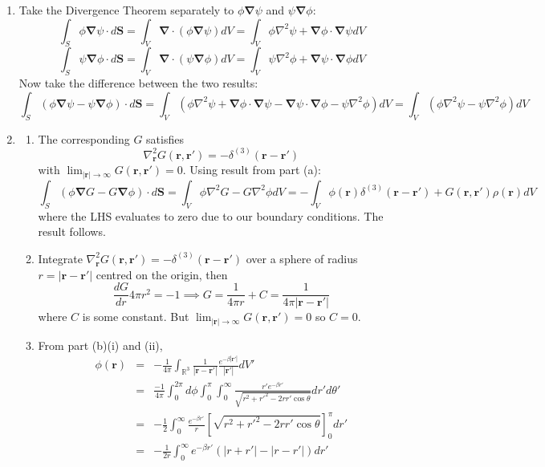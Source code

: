 \documentclass[a4paper]{article}
\begin{document}
\begin{ans}\leavevmode
\begin{enumerate}[label=(\alph*)]
\item Take the Divergence Theorem separately to $\phi\boldsymbol{\nabla}\psi$ and $\psi\boldsymbol{\nabla}\phi$:
$$\int_S\phi\boldsymbol{\nabla}\psi\cdot d\mathbf{S}=\int_V\boldsymbol{\nabla}\cdot(\phi\boldsymbol{\nabla}\psi)dV=\int_V\phi\nabla^2\psi+\boldsymbol{\nabla}\phi\cdot\boldsymbol{\nabla}\psi dV$$
$$\int_S\psi\boldsymbol{\nabla}\phi\cdot d\mathbf{S}=\int_V\boldsymbol{\nabla}\cdot(\psi\boldsymbol{\nabla}\phi)dV=\int_V\psi\nabla^2\phi+\boldsymbol{\nabla}\psi\cdot\boldsymbol{\nabla}\phi dV$$
Now take the difference between the two results:
$$\int_S(\phi\boldsymbol{\nabla}\psi-\psi\boldsymbol{\nabla}\phi)\cdot d\mathbf{S}=\int_V(\phi\nabla^2\psi+\boldsymbol{\nabla}\phi\cdot \boldsymbol{\nabla}\psi-\boldsymbol{\nabla}\psi\cdot\boldsymbol{\nabla}\phi-\psi\nabla^2\phi)dV=\int_V(\phi\nabla^2\psi-\psi\nabla^2\phi)dV$$
\item
\begin{enumerate}[label=(\roman*)]
\item The corresponding $G$ satisfies
$$\nabla_{\mathbf{r}}^2G(\mathbf{r},\mathbf{r'})=-\delta^{(3)}(\mathbf{r}-\mathbf{r'})$$
with $\lim_{|\mathbf{r}|\rightarrow\infty}G(\mathbf{r},\mathbf{r'})=0$. Using result from part (a):
$$\int_S(\phi\boldsymbol{\nabla} G-G\boldsymbol{\nabla}\phi)\cdot d\mathbf{S}=\int_V\phi\nabla^2G-G\nabla^2\phi dV=-\int_V\phi(\mathbf{r})\delta^{(3)}(\mathbf{r}-\mathbf{r'})+G(\mathbf{r},\mathbf{r'})\rho(\mathbf{r})dV$$
where the LHS evaluates to zero due to our boundary conditions. The result follows.
\item Integrate $\nabla_{\mathbf{r}}^2G(\mathbf{r},\mathbf{r'})=-\delta^{(3)}(\mathbf{r}-\mathbf{r'})$ over a sphere of radius $r=|\mathbf{r}-\mathbf{r'}|$ centred on the origin, then
$$\frac{dG}{dr}4\pi r^2=-1\implies G=\frac{1}{4\pi r}+C=\frac{1}{4\pi |\mathbf{r}-\mathbf{r'}|}$$
where $C$ is some constant. But $\lim_{|\mathbf{r}|\rightarrow\infty}G(\mathbf{r},\mathbf{r'})=0$ so $C=0$.
\item From part (b)(i) and (ii), 
\begin{eqnarray}
\phi(\mathbf{r})&=&-\frac{1}{4\pi}\int_{\mathbb{R}^3}\frac{1}{|\mathbf{r}-\mathbf{r'}|}\frac{e^{-\beta|\mathbf{r'}|}}{|\mathbf{r'}|}dV'\nonumber\\&=&\frac{-1}{4\pi}\int_0^{2\pi}d\phi\int_0^\pi\int_0^\infty\frac{r'e^{-\beta r'}}{\sqrt{r^2+r'^2-2rr'\cos\theta}}dr'd\theta'\nonumber\\&=&-\frac{1}{2}\int_0^\infty \frac{e^{-\beta r'}}{r}[\sqrt{r^2+r'^2-2rr'\cos\theta}]_0^\pi dr'\nonumber\\&=&-\frac{1}{2r}\int_0^\infty e^{-\beta r'}(|r+r'|-|r-r'|)dr'\nonumber

\end{eqnarray}
\end{enumerate}
\end{enumerate}
\end{ans}
\end{document}
